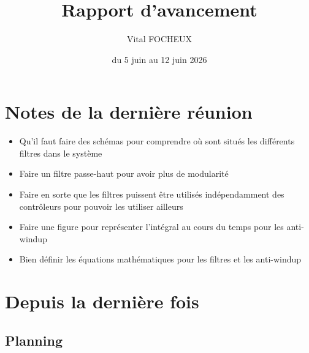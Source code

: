 \documentclass{article}
\title{Rapport d'avancement}
\author{Vital FOCHEUX}
\date{du 5 juin au 12 juin 2026}
\begin{document}
\maketitle

\section{Notes de la dernière réunion}

\begin{itemize}
    \item Qu'il faut faire des schémas pour comprendre où sont situés les différents filtres dans le système
    \item Faire un filtre passe-haut pour avoir plus de modularité
    \item Faire en sorte que les filtres puissent être utilisés indépendamment des contrôleurs pour pouvoir les utiliser ailleurs
    \item Faire une figure pour représenter l'intégral au cours du temps pour les anti-windup
    \item Bien définir les équations mathématiques pour les filtres et les anti-windup
\end{itemize}

\section{Depuis la dernière fois}

\subsection{Planning}
\end{document}
